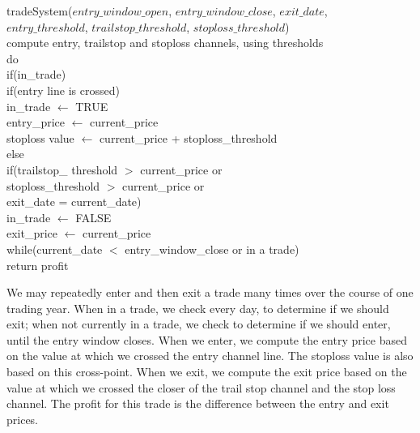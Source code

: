 \documentclass[10pt]{article}
\begin{document}
\setlength{\parindent}{5mm}
\indent tradeSystem($entry\_window\_open$, $entry\_window\_close$, $exit\_date$,\\
\indent \indent \indent \indent \indent $entry\_threshold$, $trailstop\_threshold$, $stoploss\_threshold$)\\
\indent \indent compute entry, trailstop and stoploss channels, using thresholds\\
\indent \indent do\\
\indent \indent \indent if(in\_trade)\\
\indent \indent \indent \indent if(entry line is crossed)\\
\indent \indent \indent \indent \indent in\_trade $\leftarrow$ TRUE\\
\indent \indent \indent \indent \indent entry\_price $\leftarrow$ current\_price\\
\indent \indent \indent \indent \indent stoploss value $\leftarrow$ current\_price + stoploss\_threshold\\
\indent \indent \indent else\\
\indent \indent \indent \indent if(trailstop\_ threshold $>$ current\_price or\\
\indent \indent \indent \indent \indent stoploss\_threshold $>$ current\_price or\\
\indent \indent \indent \indent \indent exit\_date = current\_date)\\
\indent \indent \indent \indent \indent in\_trade $\leftarrow$ FALSE\\
\indent \indent \indent \indent \indent exit\_price $\leftarrow$ current\_price\\
\indent \indent while(current\_date $<$ entry\_window\_close or in a trade)\\
\indent \indent return profit\\
\setlength{\parindent}{0mm}

We may repeatedly enter and then exit a trade many times over the course of one
trading year. When in a trade, we check every day, to determine if we should
exit; when not currently in a trade, we check to determine if we should enter,
until the entry window closes. When we enter, we compute the entry price based
on the value at which we crossed the entry channel line. The stoploss value is
also based on this cross-point. When we exit, we compute the exit price based on
the value at which we crossed the closer of the trail stop channel and the stop
loss channel. The profit for this trade is the difference between the entry and
exit prices.
\end{document}
